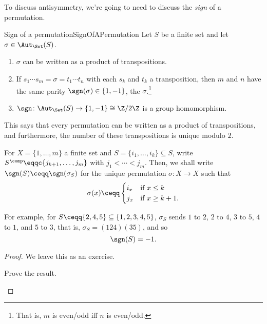 To discuss antisymmetry, we're going to need to discuss the \emph{sign} of a permutation.
\begin{thm}{Sign of a permutation}{SignOfAPermutation}
	Let $S$ be a finite set and let $\sigma \in \Aut _{\Set}(S)$.
	\begin{enumerate}
		\item $\sigma$ can be written as a product of transpositions.
		\item If $s_1\cdots s_m=\sigma =t_1\cdots t_n$ with each $s_k$ and $t_k$ a transposition, then $m$ and $n$ have the same parity $\sgn (\sigma )\in \{ 1,-1\}$\index[notation]{$\sgn (\sigma )$}, the  $\sigma$.\footnote{That is, $m$ is even/odd iff $n$ is even/odd.}
		\item $\sgn \colon \Aut _{\Set}(S)\rightarrow \{ 1,-1\} \cong \Z /2\Z$ is a group homomorphism.
	\end{enumerate}
	\begin{rmk}
		This says that every permutation can be written as a product of transpositions, and furthermore, the number of these transpositions is unique modulo $2$.
	\end{rmk}
	\begin{rmk}
		For $X=\{ 1,\ldots ,m\}$ a finite set and $S=\{ i_1,\ldots ,i_k\} \subseteq S$, write $S^{\comp}\eqqc \{ j_{k+1},\ldots ,j_m\}$ with $j_1<\cdots <j_m$.  Then, we shall write $\sgn (S)\ceqq \sgn (\sigma _S)$ for the unique permutation $\sigma \colon X\rightarrow X$ such that
		\begin{equation}
		\sigma (x)\ceqq \begin{cases}i_x & \text{if }x\leq k \\ j_x & \text{if }x\geq k+1\text{.}\end{cases}
		\end{equation}
		
		For example, for $S\ceqq \{ 2,4,5\} \subseteq \{ 1,2,3,4,5\}$, $\sigma _S$ sends $1$ to $2$, $2$ to $4$, $3$ to $5$, $4$ to $1$, and $5$ to $3$, that is, $\sigma _S=(124)(35)$, and so
		\begin{equation}
		\sgn (S)=-1.
		\end{equation}
	\end{rmk}
	\begin{proof}
		We leave this as an exercise.
		\begin{exr}[breakable=false]{}{}
			Prove the result.
		\end{exr}
	\end{proof}
\end{thm}

